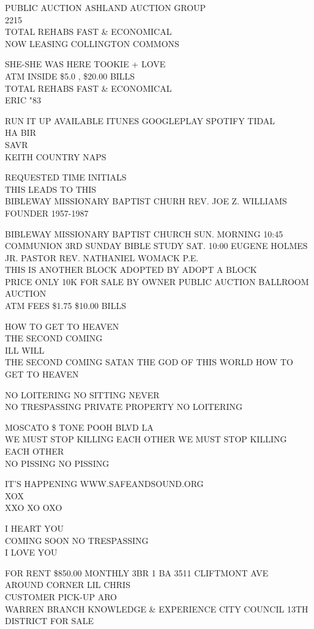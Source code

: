 \documentclass[10pt,letterpaper]{article}
\begin{document}
PUBLIC AUCTION ASHLAND AUCTION GROUP\\
2215\\
TOTAL REHABS FAST \& ECONOMICAL\\
NOW LEASING COLLINGTON COMMONS

SHE{-}SHE WAS HERE TOOKIE + LOVE\\
ATM INSIDE \$5.0 , \$20.00 BILLS\\
TOTAL REHABS FAST \& ECONOMICAL\\
ERIC "83

RUN IT UP AVAILABLE ITUNES GOOGLEPLAY SPOTIFY TIDAL\\
HA BIR\\
SAVR\\
KEITH COUNTRY NAPS

REQUESTED TIME INITIALS\\
THIS LEADS TO THIS\\
BIBLEWAY MISSIONARY BAPTIST CHURH REV. JOE Z. WILLIAMS FOUNDER 1957{-}1987

BIBLEWAY MISSIONARY BAPTIST CHURCH SUN. MORNING 10:45 COMMUNION 3RD SUNDAY BIBLE STUDY SAT. 10:00 EUGENE HOLMES JR. PASTOR REV. NATHANIEL WOMACK P.E.\\
THIS IS ANOTHER BLOCK ADOPTED BY ADOPT A BLOCK\\
PRICE ONLY 10K FOR SALE BY OWNER PUBLIC AUCTION BALLROOM AUCTION\\
ATM FEES \$1.75 \$10.00 BILLS

HOW TO GET TO HEAVEN\\
THE SECOND COMING\\
ILL WILL\\
THE SECOND COMING SATAN THE GOD OF THIS WORLD HOW TO GET TO HEAVEN

NO LOITERING NO SITTING NEVER\\
NO TRESPASSING PRIVATE PROPERTY NO LOITERING

MOSCATO \$ TONE POOH BLVD LA\\
WE MUST STOP KILLING EACH OTHER WE MUST STOP KILLING EACH OTHER\\
NO PISSING NO PISSING

IT'S HAPPENING WWW.SAFEANDSOUND.ORG\\
XOX\\
XXO XO OXO

I HEART YOU\\
COMING SOON NO TRESPASSING\\
I LOVE YOU

FOR RENT \$850.00 MONTHLY 3BR 1 BA 3511 CLIFTMONT AVE\\
AROUND CORNER LIL CHRIS\\
CUSTOMER PICK{-}UP ARO\\
WARREN BRANCH KNOWLEDGE \& EXPERIENCE CITY COUNCIL 13TH DISTRICT FOR SALE
\end{document}
